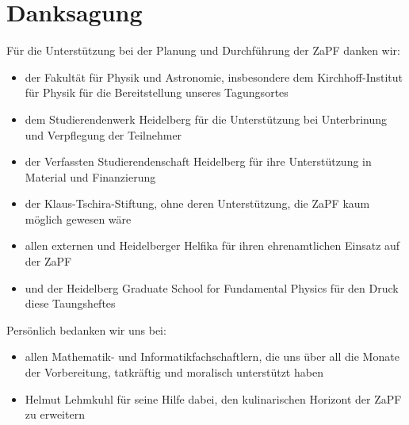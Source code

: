 
\section{Danksagung}
Für die Unterstützung bei der Planung und Durchführung der ZaPF danken wir:
\begin{itemize}
\item der Fakultät für Physik und Astronomie, insbesondere dem Kirchhoff-Institut für Physik für die Bereitstellung unseres Tagungsortes
\item dem Studierendenwerk Heidelberg für die Unterstützung bei Unterbrinung und Verpflegung der Teilnehmer
\item der Verfassten Studierendenschaft Heidelberg für ihre Unterstützung in Material und Finanzierung
\item der Klaus-Tschira-Stiftung, ohne deren Unterstützung, die ZaPF kaum möglich gewesen wäre
\item allen externen und Heidelberger Helfika für ihren ehrenamtlichen Einsatz auf der ZaPF
\item und der Heidelberg Graduate School for Fundamental Physics für den Druck diese Taungsheftes
\end{itemize}
 Persönlich bedanken wir uns bei:
 \begin{itemize}
 \item allen Mathematik- und Informatikfachschaftlern, die uns über all die Monate der Vorbereitung, tatkräftig und moralisch unterstützt haben
 \item Helmut Lehmkuhl für seine Hilfe dabei, den kulinarischen Horizont der ZaPF zu erweitern
 \end{itemize}
 

